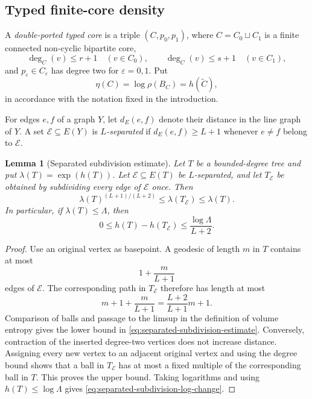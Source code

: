 \documentclass[11pt]{amsart}
\theoremstyle{plain}
\newtheorem{lemma}[theorem]{Lemma}
\theoremstyle{definition}
\theoremstyle{remark}
\begin{document}
\subsection{Typed finite-core density}

A \emph{double-ported typed core} is a triple \((C,p_0,p_1)\), where
\(C=C_0\sqcup C_1\) is a finite connected non-cyclic bipartite core,
\[
  \deg_C(v)\leq r+1\quad(v\in C_0),
  \qquad
  \deg_C(v)\leq s+1\quad(v\in C_1),
\]
and \(p_\varepsilon\in C_\varepsilon\) has degree two for
\(\varepsilon=0,1\).  Put
\[
  \eta(C)=\log\rho(B_C)=h(\widetilde C),
\]
in accordance with the notation fixed in the introduction.

For edges \(e,f\) of a graph \(Y\), let \(d_E(e,f)\) denote their distance
in the line graph of \(Y\).  A set \(\mathcal E\subseteq E(Y)\) is
\emph{\(L\)-separated} if
\(d_E(e,f)\geq L+1\) whenever \(e\neq f\) belong to \(\mathcal E\).

\begin{lemma}[Separated subdivision estimate]
\label{lem:separated-subdivision}
Let \(T\) be a bounded-degree tree and put
\(\lambda(T)=\exp(h(T))\).  Let \(\mathcal E\subseteq E(T)\) be
\(L\)-separated, and let \(T_{\mathcal E}\) be obtained by subdividing every
edge of \(\mathcal E\) once.  Then
\begin{equation}\label{eq:separated-subdivision-estimate}
  \lambda(T)^{(L+1)/(L+2)}
  \leq \lambda(T_{\mathcal E})
  \leq \lambda(T).
\end{equation}
In particular, if \(\lambda(T)\leq\Lambda\), then
\begin{equation}\label{eq:separated-subdivision-log-change}
  0\leq h(T)-h(T_{\mathcal E})
  \leq\frac{\log\Lambda}{L+2}.
\end{equation}
\end{lemma}

\begin{proof}
Use an original vertex as basepoint.  A geodesic of length \(m\) in \(T\)
contains at most
\[
  1+\frac{m}{L+1}
\]
edges of \(\mathcal E\).  The corresponding path in
\(T_{\mathcal E}\) therefore has length at most
\[
  m+1+\frac{m}{L+1}
  =\frac{L+2}{L+1}m+1.
\]
Comparison of balls and passage to the limsup in the definition of volume
entropy gives the lower bound in
\eqref{eq:separated-subdivision-estimate}.  Conversely, contraction of the
inserted degree-two vertices does not increase distance.  Assigning every
new vertex to an adjacent original vertex and using the degree bound shows
that a ball in \(T_{\mathcal E}\) has at most a fixed multiple of the
corresponding ball in \(T\).  This proves the upper bound.  Taking logarithms
and using \(h(T)\leq\log\Lambda\) gives
\eqref{eq:separated-subdivision-log-change}.
\end{proof}
\end{document}
